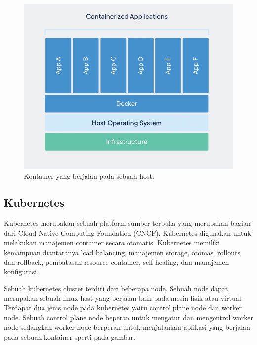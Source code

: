   \begin{figure}[H]
    \centering
      \includegraphics[scale=0.5]{gambar/docker-container}
      \caption{Kontainer yang berjalan pada sebuah host.}
      \label{containerized}
  \end{figure}

  \subsection{Kubernetes}
  Kubernetes merupakan sebuah platform sumber terbuka yang merupakan bagian dari Cloud Native Computing Foundation (CNCF). Kubernetes digunakan untuk melakukan manajemen container secara otomatis. Kubernetes memiliki kemampuan diantaranya load balancing, manajemen storage, otomasi rollouts dan rollback, pembatasan resource container, self-healing, dan manajemen konfigurasi\cite{Kubernetes}. 

  Sebuah kubernetes cluster terdiri dari beberapa node. Sebuah node dapat merupakan sebuah linux host yang berjalan baik pada mesin fisik atau virtual. Terdapat dua jenis node pada kubernetes yaitu control plane node dan worker node\cite{kubernetesNigelPoulton}. Sebuah control plane node beperan untuk mengatur dan mengontrol worker node sedangkan worker node berperan untuk menjalankan aplikasi yang berjalan pada sebuah kontainer sperti pada gambar.

